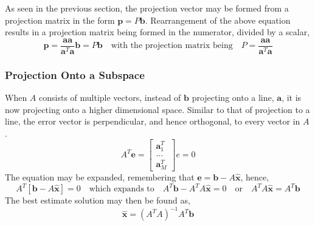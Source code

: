             \par \hfill \break
            As seen in the previous section, the projection vector may be formed from a projection matrix in the form 
            \(\boldsymbol{p}=P\boldsymbol{b}\). Rearrangement of the above equation results in a projection matrix 
            being formed in the numerator, divided by a scalar, 
            \begin{equation}
                \boldsymbol{p} = \dfrac{\boldsymbol{a} \boldsymbol{a}}{\boldsymbol{a}^T \boldsymbol{a}} \boldsymbol{b}
                = P \boldsymbol{b}
                \quad \textrm{with the projection matrix being} \quad
                P = \dfrac{\boldsymbol{a} \boldsymbol{a}}{\boldsymbol{a}^T \boldsymbol{a}}
            \end{equation}

        \subsubsection{Projection Onto a Subspace}
            When \(A\) consists of multiple vectors, instead of \(\boldsymbol{b}\) projecting onto a line, \(\boldsymbol{a}\),
            it is now projecting onto a higher dimensional space. Similar to that of projection to a line, the error
            vector is perpendicular, and hence orthogonal, to every vector in \(A\).
            \begin{equation}
                A^T \boldsymbol{e} =
                \begin{bmatrix}
                    \boldsymbol{a}^T_1 \\ ... \\ \boldsymbol{a}^T_M
                \end{bmatrix}
                e = 0
            \end{equation}
            The equation may be expanded, remembering that \(\boldsymbol{e} = \boldsymbol{b} - A \boldsymbol{\hat{x}}\),
            hence,
            \begin{equation}
                A^T [\boldsymbol{b} - A \boldsymbol{\hat{x}}] = 0
                \quad \textrm{which expands to} \quad
                A^T \boldsymbol{b} - A^T A \boldsymbol{\hat{x}} = 0
                \quad \textrm{or} \quad
                A^T A \boldsymbol{\hat{x}} = A^T \boldsymbol{b}
            \end{equation}
            The best estimate solution may then be found as,
            \begin{equation}
                \boldsymbol{\hat{x}} = (A^T A)^{-1} A^T \boldsymbol{b}
            \end{equation}
